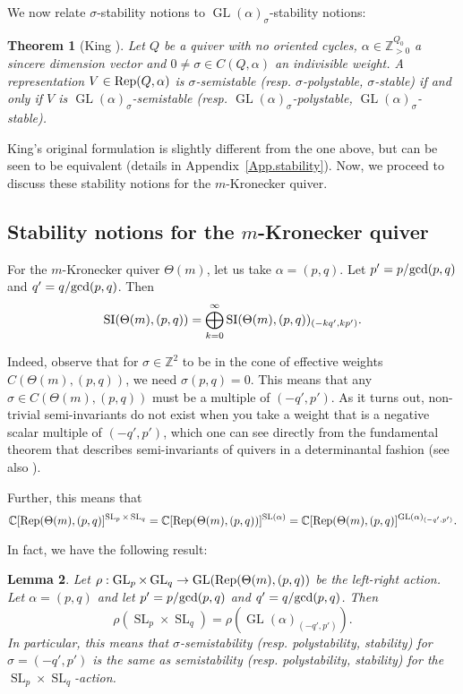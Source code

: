 \documentclass[11pt]{amsart}
\newtheorem{theorem}{Theorem}[section]
\newtheorem{lemma}[theorem]{Lemma}
\theoremstyle{definition}
\newcommand{\Rep}{{\rm Rep}}
\newcommand{\SI}{{\rm SI}}
\newcommand{\C}{{\mathbb C}}
\newcommand{\Z}{{\mathbb Z}}
\newcommand{\GL}{\operatorname{GL}}
\newcommand{\SL}{\operatorname{SL}}
\begin{document}
We now relate $\sigma$-stability notions to $\GL(\alpha)_\sigma$-stability notions:

\begin{theorem} [King \cite{King}] \label{theo:King}
Let $Q$ be a quiver with no oriented cycles, $\alpha \in \Z_{>0}^{Q_0}$ a sincere dimension vector and $0 \neq \sigma \in C(Q,\alpha)$ an indivisible weight. A representation $V \in \Rep(Q,\alpha)$ is $\sigma$-semistable (resp. $\sigma$-polystable, $\sigma$-stable) if and only if $V$ is $\GL(\alpha)_\sigma$-semistable (resp. $\GL(\alpha)_\sigma$-polystable, $\GL(\alpha)_\sigma$-stable).
\end{theorem} 

King's original formulation is slightly different from the one above, but can be seen to be equivalent (details in Appendix~\ref{App.stability}). Now, we proceed to discuss these stability notions for the $m$-Kronecker quiver.




\subsection{Stability notions for the $m$-Kronecker quiver}
For the $m$-Kronecker quiver $\Theta(m)$, let us take $\alpha = (p,q)$. Let $p' = p/{\rm gcd}(p,q)$ and $q' = q/{\rm gcd}(p,q)$. Then 
$$
\SI(\Theta(m),(p,q)) = \bigoplus_{k=0}^\infty \SI(\Theta(m), (p,q))_{(-kq',kp')}.
$$

Indeed, observe that for $\sigma \in \Z^2$ to be in the cone of effective weights $C(\Theta(m), (p,q))$, we need $\sigma(p,q) = 0$. This means that any $\sigma \in C(\Theta(m), (p,q))$ must be a multiple of $(-q',p')$. As it turns out, non-trivial semi-invariants do not exist when you take a weight that is a negative scalar multiple of $(-q',p')$, which one can see directly from the fundamental theorem that describes semi-invariants of quivers in a determinantal fashion \cite{DW-LR, DZ, SVd} (see also \cite[Theorem~10.7.1]{DW-book}).

Further, this means that 
$$
\C[\Rep(\Theta(m), (p,q)]^{\SL_p \times \SL_q} = \C[\Rep(\Theta(m), (p,q))]^{\SL(\alpha)} = \C[\Rep(\Theta(m),(p,q)]^{\GL(\alpha)_{(-q',p')}}.
$$

In fact, we have the following result:

\begin{lemma} \label{Lemma-LR-sigma}
Let $\rho: \GL_p \times \GL_q \rightarrow \GL(\Rep(\Theta(m), (p,q))$ be the left-right action. Let $\alpha = (p,q)$ and let $p' = p/{\rm gcd}(p,q)$ and $q' = q/{\rm gcd}(p,q)$. Then $$
\rho(\SL_p \times \SL_q) = \rho(\GL(\alpha)_{(-q',p')}).
$$
In particular, this means that $\sigma$-semistability (resp. polystability, stability) for $\sigma = (-q',p')$ is the same as semistability (resp. polystability, stability) for the $\SL_p \times \SL_q$-action.
\end{lemma}
\end{document}
